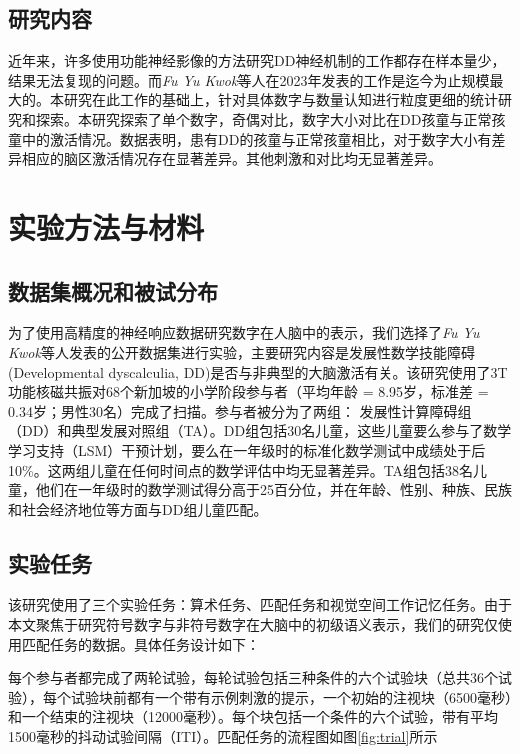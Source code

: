 \documentclass[bachelor, comfort]{shtthesis}
\begin{document}
\section{研究内容}
近年来，许多使用功能神经影像的方法研究DD神经机制的工作都存在样本量少，结果无法复现的问题\cite{num33}。而\emph{Fu Yu Kwok}等人在2023年发表的工作是迄今为止规模最大的\cite{num1}。本研究在此工作的基础上，针对具体数字与数量认知进行粒度更细的统计研究和探索。本研究探索了单个数字，奇偶对比，数字大小对比在DD孩童与正常孩童中的激活情况。数据表明，患有DD的孩童与正常孩童相比，对于数字大小有差异相应的脑区激活情况存在显著差异。其他刺激和对比均无显著差异。


\chapter{实验方法与材料} %
\section{数据集概况和被试分布}
为了使用高精度的神经响应数据研究数字在人脑中的表示，我们选择了\emph{Fu Yu Kwok}等人发表的公开数据集进行实验\cite{num1}，主要研究内容是发展性数学技能障碍(Developmental dyscalculia, DD)是否与非典型的大脑激活有关。该研究使用了3T功能核磁共振对68个新加坡的小学阶段参与者（平均年龄 = 8.95岁，标准差 = 0.34岁；男性30名）完成了扫描。参与者被分为了两组： 发展性计算障碍组（DD）和典型发展对照组（TA）。DD组包括30名儿童，这些儿童要么参与了数学学习支持（LSM）干预计划，要么在一年级时的标准化数学测试中成绩处于后10\%。这两组儿童在任何时间点的数学评估中均无显著差异。TA组包括38名儿童，他们在一年级时的数学测试得分高于25百分位，并在年龄、性别、种族、民族和社会经济地位等方面与DD组儿童匹配。

\section{实验任务}
该研究使用了三个实验任务：算术任务、匹配任务和视觉空间工作记忆任务。由于本文聚焦于研究符号数字与非符号数字在大脑中的初级语义表示，我们的研究仅使用匹配任务的数据。具体任务设计如下：

每个参与者都完成了两轮试验，每轮试验包括三种条件的六个试验块（总共36个试验），每个试验块前都有一个带有示例刺激的提示，一个初始的注视块（6500毫秒）和一个结束的注视块（12000毫秒）。每个块包括一个条件的六个试验，带有平均1500毫秒的抖动试验间隔（ITI）。匹配任务的流程图如图\ref{fig:trial}所示
\end{document}
